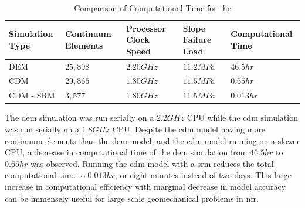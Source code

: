 \begin{table}[!htb]
\centering
\caption{{Comparison of Computational Time for the }}
\label{tab:computation}
\begin{tabularx}{\textwidth}{@{}YYYYY@{}}
\toprule
\textbf{Simulation Type} & \textbf{Continuum Elements} & \textbf{Processor Clock Speed} & \textbf{Slope Failure Load} & \textbf{Computational Time} \\ \midrule
DEM                      & $25,898$                         & $2.20 GHz$                    & $11.2 MPa$                  & $46.5 hr$                  \\
CDM                      & $29,866$                         & $1.80 GHz$                    & $11.5 MPa$                  & $0.65 hr$                  \\
CDM - SRM                      & $3,577$                         & $1.80 GHz$                    & $11.5 MPa$                  & $0.013 hr$                  \\ \bottomrule
\end{tabularx}
\end{table}

The \acrshort{dem} simulation was run serially on a $2.2GHz$ CPU while the \acrshort{cdm} simulation was run serially on a $1.8GHz$ CPU. Despite the \acrshort{cdm} model having more continuum elements than the \acrshort{dem} model, and the \acrshort{cdm} model running on a slower CPU, a decrease in computational time of the \acrshort{dem} simulation from $46.5 hr$ to $0.65 hr$ was observed. Running the \acrshort{cdm} model with a \acrshort{srm} reduces the total computational time to $0.013 hr$, or eight minutes instead of two days. This large increase in computational efficiency with marginal decrease in model accuracy can be immensely useful for large scale geomechanical problems in \acrshort{nfr}. 
